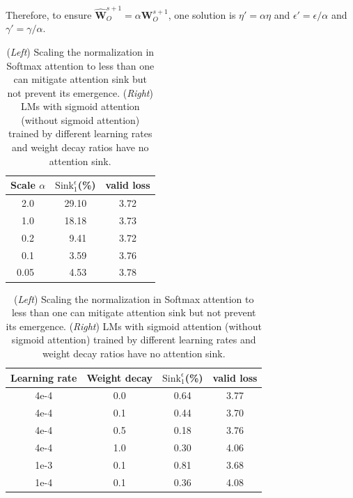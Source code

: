 \documentclass{article} \usepackage{iclr2025_conference,times}
\begin{document}
Therefore, to ensure $\hat{\boldsymbol{W}}_O^{s+1}=\alpha\boldsymbol{W}_O^{s+1}$, one solution is $\eta'=\alpha\eta$ and $\epsilon'=\epsilon / \alpha$ and $\gamma'=\gamma / \alpha$.








\begin{table}[htbp]
\caption{(\emph{Left}) Scaling the normalization in Softmax attention to less than one can mitigate attention sink but not prevent its emergence. (\emph{Right}) LMs with sigmoid attention (without sigmoid attention) trained by different learning rates and weight decay ratios have no attention sink.}
\begin{minipage}[t]{0.38\linewidth}
\begin{center}
\begin{tabular}[t]{c|cc}
\toprule
Scale $\alpha$ &$\textrm{Sink}_1^{\epsilon}$(\%) & valid loss\\
\midrule
2.0 & 29.10 & 3.72\\
1.0 & 18.18 & 3.73\\
0.2 & \,\,\,9.41 & 3.72\\
0.1 & \,\,\,3.59 & 3.76\\
0.05\,\,\, & \,\,\,4.53 & 3.78 \\
\bottomrule
\end{tabular}
\end{center}
\end{minipage}
\hfill
\begin{minipage}[t]{0.60\linewidth}
\begin{center}
\begin{tabular}[t]{cc|cc}
\toprule
Learning rate & Weight decay & $\textrm{Sink}_1^{\epsilon}$(\%) & valid loss \\
\midrule
4e-4 & 0.0 & 0.64 & 3.77 \\
4e-4 & 0.1 & 0.44 & 3.70 \\
4e-4 & 0.5 & 0.18 & 3.76 \\
4e-4 & 1.0 & 0.30 & 4.06 \\
1e-3 & 0.1 & 0.81 & 3.68 \\
1e-4 & 0.1 & 0.36 & 4.08\\
\bottomrule
\end{tabular}
\end{center}
\end{minipage}
\label{reweight}
\end{table}
\end{document}
